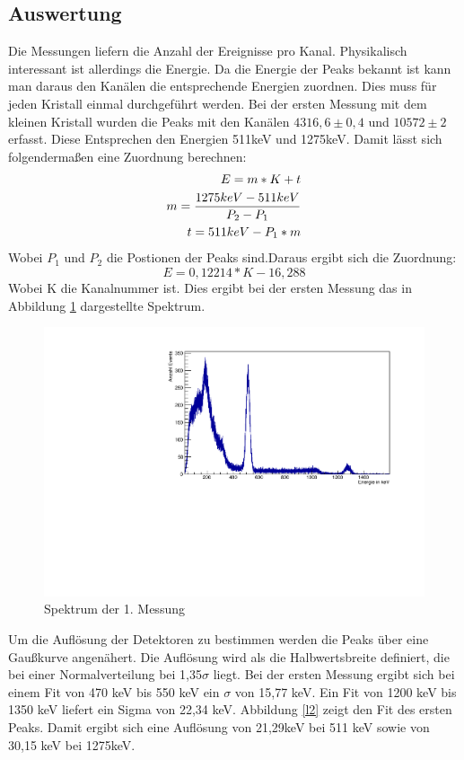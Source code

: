 \documentclass[a4paper,11pt,twoside]{article}
\begin{document}
\subsection{Auswertung}
Die Messungen liefern die Anzahl der Ereignisse pro Kanal. Physikalisch interessant ist allerdings die Energie. Da die Energie der Peaks bekannt ist kann man daraus den Kanälen die entsprechende Energien zuordnen. Dies muss für jeden Kristall einmal durchgeführt werden. Bei der ersten Messung mit dem kleinen Kristall wurden die Peaks mit den Kanälen $4316,6\pm0,4$ und $10572\pm2$ erfasst. Diese Entsprechen den Energien 511keV und 1275keV. 
Damit lässt sich folgendermaßen eine Zuordnung berechnen:
%
\begin{align}
E=m*K+t\\
m={{1275keV-511keV}\over{P_2-P_1}}\\
t=511keV-P_1*m
\end{align}
%
Wobei $P_1$ und $P_2$ die Postionen der Peaks sind.Daraus ergibt sich die Zuordnung:
%
\begin{equation}
E=0,12214*K-16,288
\end{equation}
%
Wobei K die Kanalnummer ist.
Dies ergibt bei der ersten Messung das in Abbildung \ref{l1} dargestellte Spektrum.
%
\begin{figure}[H]
	\begin{center}
		\includegraphics[width=0.7\linewidth]{Messung11.pdf}
		\caption{Spektrum der 1. Messung}
		\label{l1}
	\end{center}
\end{figure}
%
Um die Auflösung der Detektoren zu bestimmen werden die Peaks über eine Gaußkurve angenähert. Die Auflösung wird als die Halbwertsbreite definiert, die bei einer Normalverteilung bei 1,35$\sigma$ liegt. Bei der ersten Messung ergibt sich bei einem Fit von 470 keV bis 550 keV ein $\sigma$ von 15,77 keV. Ein Fit von 1200 keV bis 1350 keV liefert ein Sigma von 22,34 keV. Abbildung \ref{l2} zeigt den Fit des ersten Peaks. Damit ergibt sich eine Auflösung von 21,29keV bei 511 keV sowie von 30,15 keV bei 1275keV.
\end{document}
